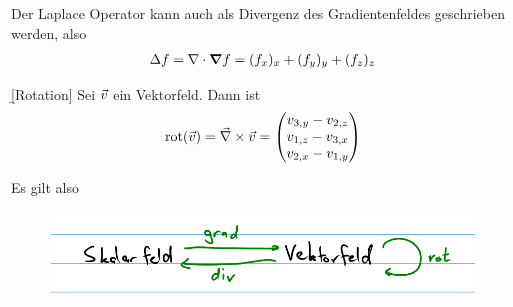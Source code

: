 \documentclass[12pt]{article}
\begin{document}
\begin{rmk}{}{}
    Der Laplace Operator kann auch als Divergenz des Gradientenfeldes geschrieben werden, also
    \begin{align}
        \Delta{f}=\nabla\cdot\grad{f}=(f_x)_x+(f_y)_y+(f_z)_z
    \end{align}
\end{rmk}

\begin{defn}{\b{[Rotation]}} Sei $\vec{v}$ ein Vektorfeld. Dann ist
    \begin{align}
        \mathrm{rot}(\vec{v})=\vec\nabla\times\vec{v}=\begin{pmatrix}
                                                    v_{3,y}-v_{2,z} \\
                                                    v_{1,z}-v_{3,x} \\
                                                    v_{2,x}-v_{1,y}
                                                \end{pmatrix}
    \end{align}
\end{defn}

Es gilt also
\begin{figure}[htbp!]
    \centering
    \includegraphics[scale=0.6]{imgs/skalarfeld-vektorfeld-relation.png}
\end{figure}
\end{document}
